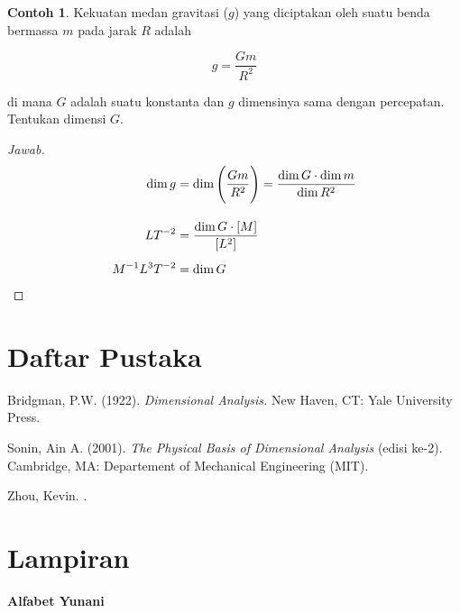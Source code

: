 \documentclass[12pt, a4paper]{article}\usepackage[utf8]{inputenc}
\theoremstyle{plain}
\theoremstyle{plain}
\numberwithin{equation}{section}
\theoremstyle{definition}
\newtheorem{contoh}[teorema]{Contoh}
\begin{document}
	\begin{contoh}
		Kekuatan medan gravitasi ($g$) yang diciptakan oleh suatu benda bermassa $m$ pada jarak $R$ adalah
		
		\begin{equation*}
			g = \frac{Gm}{R^2}
		\end{equation*}
		
		di mana $G$ adalah suatu konstanta dan $g$ dimensinya sama dengan percepatan. Tentukan dimensi $G$.
	\end{contoh}
	
	\begin{proof}[Jawab]
		\begin{align*}
			\dim g &= \dim \Bigg( \frac{Gm}{R^2} \Bigg)  = \frac{\dim G \cdot \dim m}{\dim R^2}\\[1em]
			LT^{-2} &= \frac{\dim G \cdot [M]}{[L^2]}\\[.5em]
			M^{-1} L^{3} T^{-2} &= \dim G \qedhere
		\end{align*}
	\end{proof}
	
	\section{Daftar Pustaka}
	
	\par Bridgman, P.W. (1922). \textit{Dimensional Analysis.} New Haven, CT: Yale University Press.
	\par Sonin, Ain A. (2001). \textit{The Physical Basis of Dimensional Analysis} (edisi ke-2). Cambridge, MA: Departement of Mechanical Engineering (MIT).
	\par Zhou, Kevin. . \hyperlink{knzhou.github.io}{\color{blue}{knzhou.github.io}}
	
	
	\vspace{3em}
	\pagebreak
	\section{Lampiran}
	
	\begin{center}
		\textbf{Alfabet Yunani}
	\end{center}
	
\end{document}
